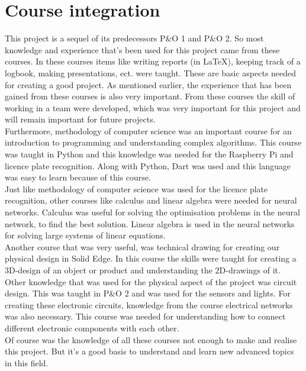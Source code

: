 \section{Course integration}\label{sec:course-integration}
This project is a sequel of its predecessors P\&O 1 and P\&O 2. So most knowledge and experience that's been used for this project came from these courses. In these courses items like writing reports (in \LaTeX), keeping track of a logbook, making presentations, ect. were taught. These are basic aspects needed for creating a good project. As mentioned earlier, the experience that has been gained from these courses is also very important. From these courses the skill of working in a team were developed, which was very important for this project and will remain important for future projects. \\

\noindent Furthermore, methodology of computer science was an important course for an introduction to programming and understanding complex algorithms. This course was taught in Python and this knowledge was needed for the Raspberry Pi and licence plate recognition. Along with Python, Dart was used and this language was easy to learn because of this course.  \\

\noindent Just like methodology of computer science was used for the licence plate recognition, other courses like calculus and linear algebra were needed for neural networks. Calculus was useful for solving the optimisation problems in the neural network, to find the best solution. Linear algebra is used in the neural networks for solving large systems of linear equations. \\  

\noindent Another course that was very useful, was technical drawing for creating our physical design in Solid Edge. In this course the skills were taught for creating a 3D-design of an object or product and understanding the 2D-drawings of it. Other knowledge that was used for the physical aspect of the project was circuit design. This was taught in P\&O 2 and was used for the sensors and lights. For creating these electronic circuits, knowledge from the course electrical networks was also necessary. This course was needed for understanding how to connect different electronic components with each other.\\

\noindent Of course was the knowledge of all these courses not enough to make and realise this project. But it's a good basis to understand and learn new advanced topics in this field.  

\clearpage
{}



\clearpage